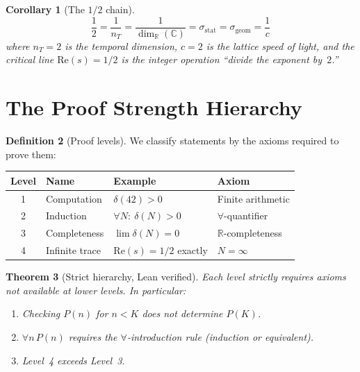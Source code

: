 \documentclass[12pt]{article}
\newtheorem{theorem}{Theorem}[section]
\newtheorem{corollary}[theorem]{Corollary}
\theoremstyle{definition}
\newtheorem{definition}[theorem]{Definition}
\theoremstyle{remark}
\newcommand{\CC}{\mathbb{C}}
\newcommand{\RR}{\mathbb{R}}
\begin{document}
\begin{corollary}[The $1/2$ chain]
\[
  \frac{1}{2} = \frac{1}{n_T} = \frac{1}{\dim_\RR(\CC)}
  = \sigma_{\mathrm{stat}} = \sigma_{\mathrm{geom}}
  = \frac{1}{c}
\]
where $n_T = 2$ is the temporal dimension, $c = 2$ is the
lattice speed of light, and the critical line
$\mathrm{Re}(s) = 1/2$ is the integer operation
``divide the exponent by~$2$.''
\end{corollary}

\section{The Proof Strength Hierarchy}
\label{sec:levels}

\begin{definition}[Proof levels]\label{def:levels}
We classify statements by the axioms required to prove them:
\begin{center}
\begin{tabular}{clll}
\toprule
Level & Name & Example & Axiom \\
\midrule
1 & Computation & $\delta(42) > 0$ & Finite arithmetic \\
2 & Induction & $\forall N\!:\ \delta(N) > 0$ & $\forall$-quantifier \\
3 & Completeness & $\lim \delta(N) = 0$ & $\RR$-completeness \\
4 & Infinite trace & $\mathrm{Re}(s) = 1/2$ exactly & $N = \infty$ \\
\bottomrule
\end{tabular}
\end{center}
\end{definition}

\begin{theorem}[Strict hierarchy, Lean verified]\label{thm:hierarchy}
Each level strictly requires axioms not available at lower levels.
In particular:
\begin{enumerate}[label=(\alph*)]
\item Checking $P(n)$ for $n < K$ does not determine $P(K)$.
\item $\forall n\, P(n)$ requires the $\forall$-introduction
  rule (induction or equivalent).
\item Level~4 exceeds Level~3.
\end{enumerate}
\end{theorem}
\end{document}
